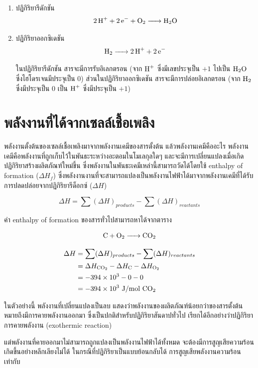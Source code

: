 \documentclass[a4paper,nobib,openany,10pt]{tufte-book}
\begin{document}
\begin{enumerate}
\item ปฏิกิริยารีดักชัน
\label{sec:orge5b133d}
\[ \ce{2H^+ + 2e^- + O2 -> H_2O}\]

\item ปฏิกิริยาออกซิเดชัน
\label{sec:org4fc0b3e}
\[ \ce{H2 -> 2H^+ + 2e^-}\]

ในปฏิกิริยารีดักชัน สารจะมีการรับอิเลกตรอน (จาก \(\ce{H^+}\) ซึ่งมีเลขประจุเป็น \(+1\) ไปเป็น \(\ce{H2O}\) ซึ่งไฮโดรเจนมีประจุเป็น 0) ส่วนในปฏิกิริยาออกซิเดชัน สารจะมีการปล่อยอิเลกตรอน (จาก \(\ce{H2}\) ซึ่งมีประจุเป็น 0 เป็น \(\ce{H^+}\) ซึ่งมีประจุเป็น \(+1\))
\end{enumerate}

\section{พลังงานที่ได้จากเซลล์เชื้อเพลิง}
\label{sec:orge8fe463}
พลังงานตั้งต้นของเซลล์เชื้อเพลิงมาจากพลังงานเคมีของสารตั้งต้น
แล้วพลังงานเคมีคืออะไร
พลังงานเคมีคือพลังงานที่ถูกเก็บไว้ในพันธะระหว่างอะตอมในโมเลกุลใดๆ
และจะมีการเปลี่ยนแปลงเมื่อเกิดปฏิกิริยาสร้างผลิตภัณฑ์ใหม่ขึ้น
ซึ่งพลังงานในพันธะเคมีเหล่านี้สามารถวัดได้โดยใช้ enthalpy of formation
(\(\Delta H_f\))
ซึ่งพลังงานงานที่จะสามารถแปลงเป็นพลังงานไฟฟ้าได้มาจากพลังงานเคมีที่ได้รับการปลดปล่อยจากปฏิกิริยารีด็อกซ์
(\(\Delta H\))

\[\Delta H = \sum (\Delta H)_{products} - \sum (\Delta H)_{reactants}\]

ค่า enthalpy of formation ของสารทั่วไปสามารถหาได้จากตาราง

\[\ce{C + O2 -> CO_2}\]

\[\begin{aligned}
  \Delta H &= \sum (\Delta H)_{products} - \sum (\Delta H)_{reactants} \\
           &= \Delta H_{\ce{CO2}} - \Delta H_{\ce{C}} - \Delta H_{\ce{O2}} \\
           &= -394 \times 10^3 - 0 - 0 \\
           &= -394 \times 10^3 \text{ J/mol } \ce{CO2} \end{aligned}\]

ในตัวอย่างนี้ พลังงานที่เปลี่ยนแปลงเป็นลบ
แสดงว่าพลังงานของผลิตภัณฑ์น้อยกว่าของสารตั้งต้น
หมายถึงมีการคายพลังงานออกมา ซึ่งเป็นปกติสำหรับปฏิกิริยาสันดาปทั่วไป
เรียกได้อีกอย่างว่าปฏิกิริยาการคายพลังงาน (exothermic reaction)

แต่พลังงานที่คายออกมาไม่สามารถถูกแปลงเป็นพลังงานไฟฟ้าได้ทั้งหมด
จะต้องมีการสูญเสียความร้อนเกิดขึ้นอย่างหลีกเลียงไม่ได้
ในกรณีที่ปฏิกิริยาเป็นแบบย้อนกลับได้ การสูญเสียพลังงานความร้อนเท่ากับ
\end{document}
